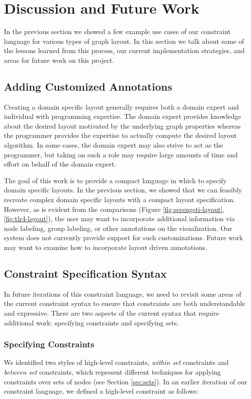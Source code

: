 \section{Discussion and Future Work}
In the previous section we showed a few example use cases of our constraint language for various types of graph layout. In this section we talk about some of the lessons learned from this process, our current implementation strategies, and areas for future work on this project.

\subsection{Adding Customized Annotations}
Creating a domain specific layout generally requires both a domain expert and individual with programming expertise. The domain expert provides knowledge about the desired layout motivated by the underlying graph properties whereas the programmer provides the expertise to actually compute the desired layout algorithm. In some cases, the domain expert may also strive to act as the programmer, but taking on such a role may require large amounts of time and effort on behalf of the domain expert.

The goal of this work is to provide a compact language in which to specify domain specific layouts. In the previous section, we showed that we can feasibly recreate complex domain specific layouts with a compact layout specification. However, as is evident from the comparisons (Figure \ref{fig:serengeti-layout}, \ref{fig:tlr4-layout}), the user may want to incorporate additional information via node labeling, group labeling, or other annotations on the visualization. Our system does not currently provide support for such customizations. Future work may want to examine how to incorporate layout driven annotations.

\subsection{Constraint Specification Syntax}
In future iterations of this constraint language, we need to revisit some areas of the current constraint syntax to ensure that constraints are both understandable and expressive. There are two aspects of the current syntax that require additional work: specifying constraints and specifying sets.

\subsubsection{Specifying Constraints}
We identified two styles of high-level constraints, \emph{within set} constraints and \emph{between set} constraints, which represent different techniques for applying constraints over sets of nodes (see Section \ref{sec:sets}). In an earlier iteration of our constraint language, we defined a high-level constraint as follows:


